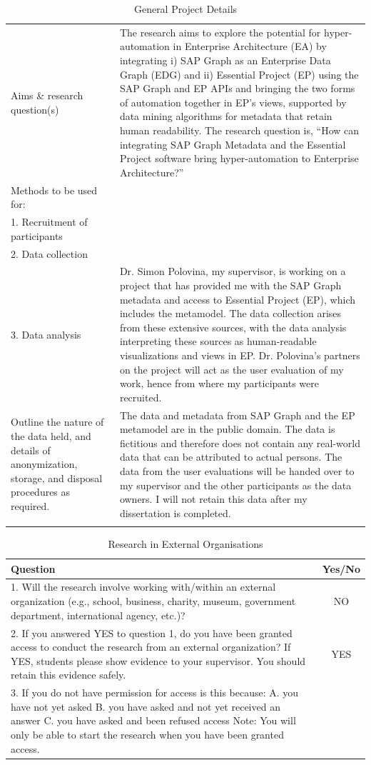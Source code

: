\documentclass{article}
\begin{document}
\begin{longtable}{|p{4.5cm}|p{6.5cm}|}
Aims \& research question(s) & The research aims to explore the potential for hyper-automation in Enterprise Architecture (EA) by integrating i) SAP Graph as an Enterprise Data Graph (EDG) and ii) Essential Project (EP) using the SAP Graph and EP APIs and bringing the two forms of automation together in EP’s views, supported by data mining algorithms for metadata that retain human readability. The research question is, “How can integrating SAP Graph Metadata and the Essential Project software bring hyper-automation to Enterprise Architecture?” \\
Methods to be used for: & \\
1. Recruitment of participants & \\
2. Data collection & \\
3. Data analysis & Dr. Simon Polovina, my supervisor, is working on a project that has provided me with the SAP Graph metadata and access to Essential Project (EP), which includes the metamodel. The data collection arises from these extensive sources, with the data analysis interpreting these sources as human-readable visualizations and views in EP. Dr. Polovina’s partners on the project will act as the user evaluation of my work, hence from where my participants were recruited. \\
Outline the nature of the data held, and details of anonymization, storage, and disposal procedures as required. & The data and metadata from SAP Graph and the EP metamodel are in the public domain. The data is fictitious and therefore does not contain any real-world data that can be attributed to actual persons. The data from the user evaluations will be handed over to my supervisor and the other participants as the data owners. I will not retain this data after my dissertation is completed. \\
\hline
\caption{General Project Details}
\end{longtable}

\begin{table}
\centering
\begin{tabular}{|p{11cm}|c|}
\hline
Question & Yes/No \\
\hline
1. Will the research involve working with/within an external organization (e.g., school, business, charity, museum, government department, international agency, etc.)? & NO \\
2. If you answered YES to question 1, do you have been granted access to conduct the research from an external organization? If YES, students please show evidence to your supervisor. You should retain this evidence safely. & YES \\
3. If you do not have permission for access is this because: A. you have not yet asked B. you have asked and not yet received an answer C. you have asked and been refused access Note: You will only be able to start the research when you have been granted access. & \\
\hline
\end{tabular}
\caption{Research in External Organisations}
\end{table}
\end{document}
